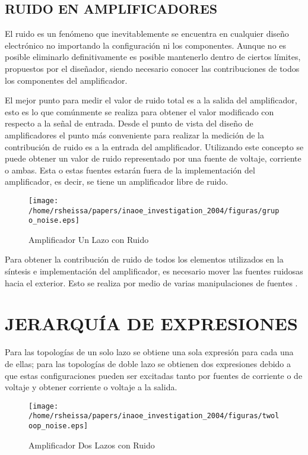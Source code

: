 \documentclass[10pt,twocolumn,twoside,letterpaper]{IEEEtran}
\begin{document}
{\begin{center}\subsection{{\bf RUIDO EN AMPLIFICADORES}}\end{center}
El ruido es un fen\'omeno que inevitablemente se encuentra en cualquier dise\~no electr\'onico no importando la con\-fi\-gu\-ra\-ci\'on ni los componentes. Aunque no es posible eliminarlo definitivamente es posible mantenerlo dentro de ciertos l\'imites, propuestos por el dise\~nador, siendo necesario conocer las contribuciones de todos los componentes del amplificador.

El mejor punto para medir el valor de ruido \mbox{total} es a la salida del amplificador, esto es lo que com\'unmente se realiza para obtener el valor modificado con respecto a la se\~nal de entrada. Desde el punto de vista del dise\~no de amplificadores el punto m\'as conveniente para realizar la medici\'on de la contribuci\'on de ruido es a la entrada del amplificador. Utilizando este concepto se puede obtener un valor de ruido representado por una fuente de voltaje, corriente o ambas. Esta o estas fuentes estar\'an fuera de la implementaci\'on del amplificador, es decir, se tiene un amplificador libre de ruido.

\begin{figure}[hbtp]
   \centering
   \texttt{[image: /home/rsheissa/papers/inaoe\_investigation\_2004/figuras/grupo\_noise.eps]}
   \caption{Amplificador Un Lazo con Ruido}
   \label{fig:grupo_noise}
\end{figure}

Para obtener la contribuci\'on de ruido de todos los elementos utilizados en la s\'intesis e implementaci\'on del amplificador, es necesario mover las fuentes ruidosas hacia el exterior. Esto se realiza por medio de varias manipulaciones de fuentes \cite{verhoeven,nordholt}.
\\
\section{{\bf JERARQU\'IA DE EXPRESIONES}}
 Para las topolog\'ias de un solo lazo se obtiene una sola expresi\'on para cada una de ellas; para las topolog\'ias de doble lazo se obtienen dos expresiones debido a que estas configuraciones pueden ser excitadas tanto por fuentes de corriente o de voltaje y obtener corriente o voltaje a la salida.

\begin{figure}
   \centering
   \texttt{[image: /home/rsheissa/papers/inaoe\_investigation\_2004/figuras/twoloop\_noise.eps]}
   \caption{Amplificador Dos Lazos con Ruido}
   \label{fig:twoloop_noise}
\end{figure}

}
\end{document}
